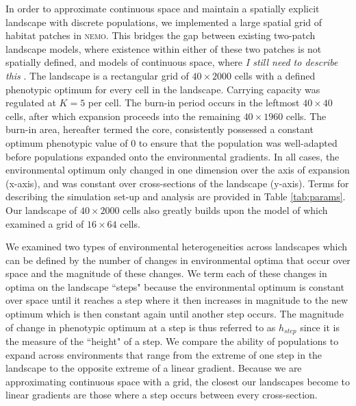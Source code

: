 In order to approximate continuous space and maintain a spatially explicit landscape with discrete populations, we implemented a large spatial grid of habitat patches in \textsc{nemo}. This bridges the gap between existing two-patch landscape models, where existence within either of these two patches is not spatially defined, and models of continuous space, where \emph{\color{red} \footnotesize I still need to describe this  \normalsize \color{black}}. The landscape is a rectangular grid of $40\times2000$ cells with a defined phenotypic optimum for every cell in the landscape. Carrying capacity was regulated at $K = 5$ per cell. The burn-in period occurs in the leftmost $40\times40$ cells, after which expansion proceeds into the remaining $40\times1960$ cells. The burn-in area, hereafter termed the core, consistently possessed a constant optimum phenotypic value of 0 to ensure that the population was well-adapted before populations expanded onto the environmental gradients. In all cases, the environmental optimum only changed in one dimension over the axis of expansion (x-axis), and was constant over cross-sections of the landscape (y-axis). Terms for describing the simulation set-up and analysis are provided in Table \ref{tab:params}. Our landscape of $40\times2000$ cells also greatly builds upon the model of \citet{Schiffers:2014} which examined a grid of $16\times64$ cells.

We examined two %
types of environmental heterogeneities across landscapes which can be defined by the number of changes in environmental optima that occur over space and the magnitude of these changes. We term each of these changes in optima on the landscape ``steps" because the environmental optimum is constant over space until it reaches a step where it then increases in magnitude to the new optimum which is then constant again until another step occurs. The magnitude of change in phenotypic optimum at a step is thus referred to as $h_{step}$ since it is the measure of the ``height" of a step. %
We compare the ability of populations to expand across environments that range from the extreme of one step in the landscape to the opposite extreme of a linear gradient. Because we are approximating continuous space with a grid, the closest our landscapes become to linear gradients are those where a step occurs between every cross-section.





